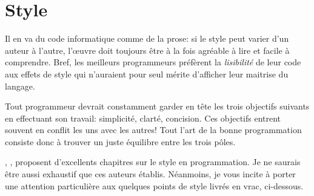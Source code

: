 \section{Style}
\label{sec:collaboration:style}

Il en va du code informatique comme de la prose: si le style peut
varier d'un auteur à l'autre, l'œuvre doit toujours être à la fois
agréable à lire et facile à comprendre. Bref, les meilleurs
programmeurs préfèrent la \emph{lisibilité} de leur code aux effets de
style qui n'auraient pour seul mérite d'afficher leur maitrise du
langage.

Tout programmeur devrait constamment garder en tête les trois
objectifs suivants en effectuant son travail: simplicité, clarté,
concision. Ces objectifs entrent souvent en conflit les uns avec les
autres! Tout l'art de la bonne programmation consiste donc à trouver
un juste équilibre entre les trois pôles.

\citet{Kernighan:practice:1999},
\citet{Oualline:C:1997,Oualline:C++:2003},
\citet{Kernighan:style:1978} proposent d'excellents chapitres sur le
style en programmation. Je ne saurais être aussi exhaustif que ces
auteurs établis. Néanmoins, je vous incite à porter une attention
particulière aux quelques points de style livrés en vrac, ci-dessous.

